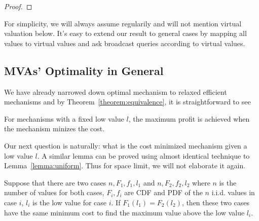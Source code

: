 \begin{proof}
%
%
\end{proof}

For simplicity, we will always assume regularily and will not mention virtual
valuation below.  It's easy to extend our result to general cases by mapping
all values to virtual values and ask broadcast queries according to virtual
values.

\subsection{MVAs' Optimality in General}

We have already narrowed down optimal mechanism to
relaxed efficient mechanisms and by Theorem~\ref{theorem:equivalence},
it is straightforward to see

\begin{corollary}

For mechanisms with a fixed low value $l$, the maximum profit is
achieved when the mechanism minizes the cost.

\end{corollary}

Our next question is naturally: what is the cost minimized mechanism
given a low value $l$. 
A similar lemma can be proved using almost identical technique to Lemma~\ref{lemma:uniform}.
Thus for space limit, we will not elaborate it again. 

\begin{lemma}\label{lemma:lowest_type}
Suppose that there are two cases $n, F_1, f_1, l_1$ and $n, F_2, f_2, l_2$
where $n$ is the number of values for both cases, $F_i, f_i$ are CDF and PDF
of the $n$ i.i.d. values in case $i$, $l_i$ is the low value for case $i$.
If $F_1(l_1) = F_2(l_2)$, then these two cases have the same minimum cost
to find the maximum value above the low value $l_i$.
\end{lemma}

